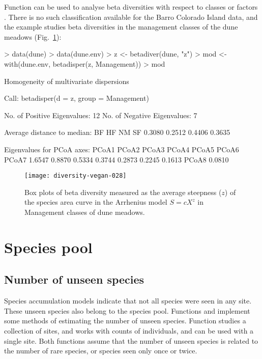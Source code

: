 \documentclass[a4paper,10pt,twocolumn]{article}
\begin{document}
Function  can be used to analyse beta diversities
with respect to classes or factors \citep{Anderson06, AndersonEtal06}.
There is no such classification available for the Barro Colorado
Island data, and the example studies beta diversities in the
management classes of the dune meadows (Fig.~\ref{fig:betadisper}):
\begin{Schunk}
\begin{Sinput}
> data(dune)
> data(dune.env)
> z <- betadiver(dune, "z")
> mod <- with(dune.env, betadisper(z, Management))
> mod
\end{Sinput}
\begin{Soutput}
	Homogeneity of multivariate dispersions

Call: betadisper(d = z, group = Management)

No. of Positive Eigenvalues: 12
No. of Negative Eigenvalues: 7

Average distance to median:
    BF     HF     NM     SF 
0.3080 0.2512 0.4406 0.3635 

Eigenvalues for PCoA axes:
 PCoA1  PCoA2  PCoA3  PCoA4  PCoA5  PCoA6  PCoA7 
1.6547 0.8870 0.5334 0.3744 0.2873 0.2245 0.1613 
 PCoA8 
0.0810 
\end{Soutput}
\end{Schunk}
\begin{figure}
\texttt{[image: diversity-vegan-028]}
\caption{Box plots of beta diversity measured as the average steepness
  ($z$) of the species area curve in the Arrhenius model $S = cX^z$ in
  Management classes of dune meadows.}
\label{fig:betadisper}
\end{figure}

\section{Species pool}
\subsection{Number of unseen species}

Species accumulation models indicate that not all species were seen in
any site.  These unseen species also belong to the species pool.
Functions  and  implement some
methods of estimating the number of unseen species.  Function
 studies a collection of sites, and
 works with counts of individuals, and can be used
with a single site.  Both functions assume that the number of unseen
species is related to the number of rare species, or species seen only
once or twice.
\end{document}
